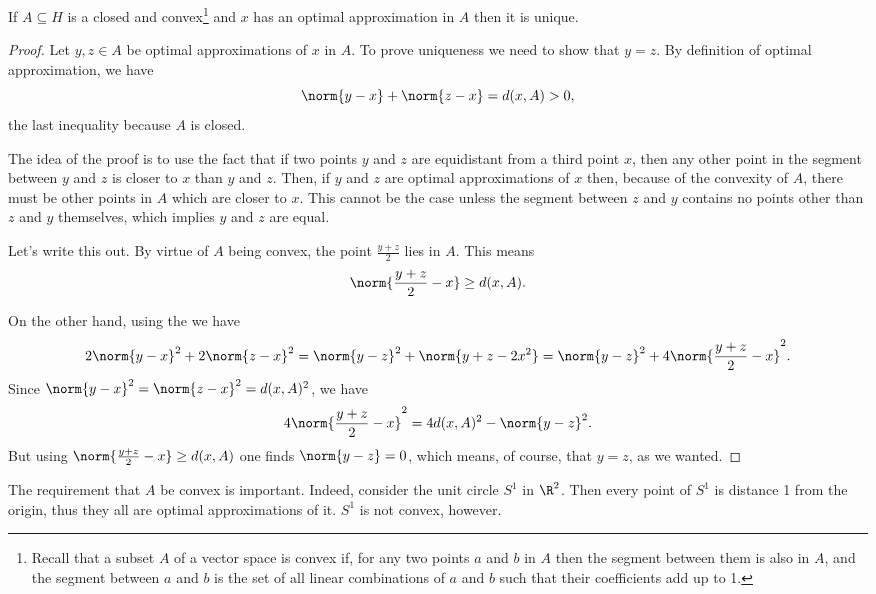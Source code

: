 \documentclass[12pt,oneside]{book}
\begin{document}
\begin{proposition}
	If \( A \subseteq H \) is a closed and convex\footnote{Recall that a subset \( A \) of a
	vector space is convex if, for any two points \( a \) and \( b \) in \( A \) then the
segment between them is also in	\( A \), and the segment between \( a \) and \( b \) is
the set of all linear combinations of \( a \) and \( b \) such that their coefficients add
up to 1.} and \( x \) has an optimal approximation in	\( A \) then it is unique.
\end{proposition}
\begin{proof}
	Let \( y, z \in A \) be optimal approximations of \( x \) in \( A \). To prove
	uniqueness we need to show that \( y = z \). By definition of optimal approximation, we
	have
	\begin{equation*}
		\norm{y - x} + \norm{z - x} = d(x,A) > 0,
	\end{equation*}
	the last inequality because \( A \) is closed. 

	The idea of the proof is to use the fact that if two points \( y \) and \( z \)  are
	equidistant from a third point \( x \), then any other point in the segment between \( y
	\) and \( z \) is closer to \( x \) than \( y \) and \( z \). Then, if \( y \) and \( z \) are
	optimal approximations of \( x \) then, because of the convexity of \( A \), there must
	be other points in \( A \) which are closer to \( x \). This cannot be the case unless
	the segment between \( z \) and \( y \) contains no points other than \( z \) and \( y
	\) themselves, which implies \( y \) and \( z \) are equal.

	Let's write this out. By virtue of \( A \) being convex, the point \( \frac{y+z}{2} \)
	lies in	\( A \). This means
	\begin{equation*}
		\norm{\frac{y+z}{2} - x} \geq d(x,A).
	\end{equation*}
	
	On the other hand, using the  we have
	\begin{equation*}
		2\norm{y-x}^2 + 2\norm{z-x}^2  = \norm{y-z}^2 + \norm{y+z - 2x^2} = \norm{y-z}^2 +
		4\norm{\frac{y+z}{2} - x}^2.
	\end{equation*}
	Since \( \norm{y-x}^2 = \norm{z-x}^2 = d(x,A)^2 \), we have
	\begin{equation*}
		4\norm{\frac{y+z}{2} - x}^2 = 4d(x,A)^2 - \norm{y - z}^2.
	\end{equation*}
	But using \( \norm{\frac{y+z}{2} - x} \geq d(x,A) \) one finds \( \norm{y - z} = 0 \),
	which means, of course, that \( y = z \), as we wanted.
\end{proof}
The requirement that \( A \) be convex is important. Indeed, consider the unit circle \(
S^1 \) in \( \R^2 \). Then every point of \( S^1 \) is distance 1 from the origin, thus
they all are optimal approximations of it. \( S^1 \) is not convex, however.
\end{document}
